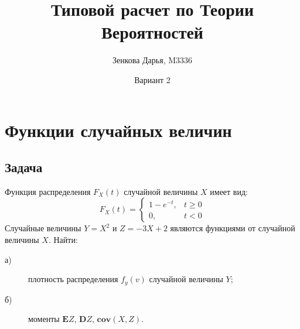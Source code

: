 \documentclass[fleqn, 10pt]{article}
\title{Типовой расчет по Теории Вероятностей}
\author{Зенкова Дарья, M3336}
\date{Вариант 2}
\begin{document}
\maketitle
\newpage
{}

\section{Функции случайных величин}
\subsection{Задача}
Функция распределения \(F_X(t)\) случайной величины \(X\) имеет вид:
\[F_X(t) =
\begin{cases}
  1 - e^{-t}, & t \geq 0 \\
  0, & t < 0
\end{cases}\]
Случайные величины \(Y = X^2\) и \(Z=-3X+2\) являются функциями от случайной величины \(X\).
Найти:
\begin{description}
\item[а)] плотность распределения \(f_y(v)\) случайной величины \(Y\);
\item[б)] моменты \(\textbf{E}Z\), \(\textbf{D}Z\), \(\textbf{cov}(X,Z)\).
\end{description}
\end{document}
